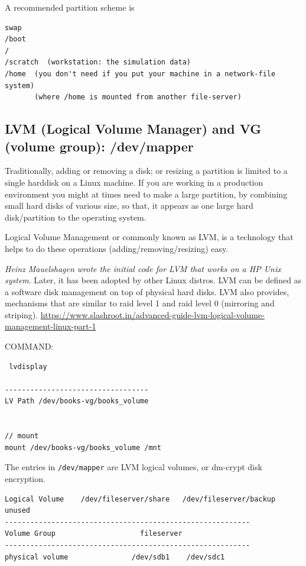 A recommended partition scheme is
\begin{verbatim}
swap
/boot
/
/scratch  (workstation: the simulation data)
/home  (you don't need if you put your machine in a network-file system)
       (where /home is mounted from another file-server)
\end{verbatim}




\subsection{LVM (Logical Volume Manager) and VG (volume group): /dev/mapper}
\label{sec:LVM}
\label{sec:logical-volume-manager}
\label{sec:volume-group}
\label{sec:dev-mapper}

Traditionally, adding or removing a disk; or resizing a partition is limited to
a single harddisk on a Linux machine.  If you are working in a production
environment you might at times need to make a large partition, by combining
small hard disks of various size, so that, it appears as one large hard
disk/partition to the operating system.

Logical Volume Management or commonly known as LVM, is a technology that helps
to do these operations (adding/removing/resizing) easy. 

{\it Heinz Mauelshagen wrote the initial code for LVM that works on a HP Unix
system}. Later, it has been adopted by other Linux distros.
LVM can be defined as a software disk management on top of physical hard disks.
LVM also provides, mechanisms that are similar to raid level 1 and raid level 0
(mirroring and striping).
\url{https://www.slashroot.in/advanced-guide-lvm-logical-volume-management-linux-part-1}

COMMAND:
\begin{verbatim}
 lvdisplay
 
----------------------------------
LV Path /dev/books-vg/books_volume


// mount
mount /dev/books-vg/books_volume /mnt
\end{verbatim}

The entries in \verb!/dev/mapper! are LVM logical volumes, or 
 dm-crypt disk encryption. 

\begin{verbatim}
Logical Volume    /dev/fileserver/share   /dev/fileserver/backup  unused
----------------------------------------------------------
Volume Group                    fileserver
----------------------------------------------------------
physical volume               /dev/sdb1    /dev/sdc1
\end{verbatim}

